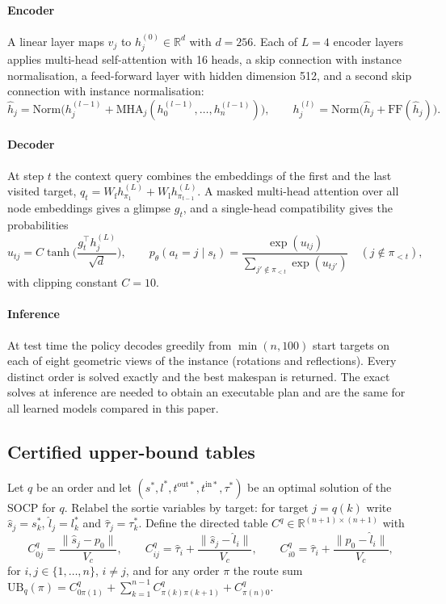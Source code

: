 \documentclass[preprint,review,12pt,authoryear]{elsarticle}
\newcommand{\R}{\mathbb{R}}
\newcommand{\UB}{\mathrm{UB}}
\begin{document}
\paragraph{Encoder} A linear layer maps $v_j$ to $h^{(0)}_j\in\R^{d}$ with $d=256$. Each of $L=4$ encoder layers
applies multi-head self-attention \citep{vaswani2017attention} with 16 heads, a skip connection with instance
normalisation, a feed-forward layer with hidden dimension 512, and a second skip connection with instance
normalisation:
\begin{equation}
\hat h_j=\mathrm{Norm}\big(h^{(l-1)}_j+\mathrm{MHA}_j(h^{(l-1)}_0,\dots,h^{(l-1)}_n)\big),\qquad
h^{(l)}_j=\mathrm{Norm}\big(\hat h_j+\mathrm{FF}(\hat h_j)\big).
\end{equation}

\paragraph{Decoder} At step $t$ the context query combines the embeddings of the first and the last visited
target, $q_t=W_{\mathrm{f}}h^{(L)}_{\pi_1}+W_{\mathrm{l}}h^{(L)}_{\pi_{t-1}}$. A masked multi-head attention over
all node embeddings gives a glimpse $g_t$, and a single-head compatibility gives the probabilities
\begin{equation}
u_{tj}=C\tanh\!\Big(\frac{g_t^{\top}h^{(L)}_j}{\sqrt d}\Big),\qquad
p_\theta(a_t=j\mid s_t)=\frac{\exp(u_{tj})}{\sum_{j'\notin\pi_{<t}}\exp(u_{tj'})}\quad(j\notin\pi_{<t}),
\end{equation}
with clipping constant $C=10$.

\paragraph{Inference} At test time the policy decodes greedily from $\min(n,100)$ start targets on each of
eight geometric views of the instance (rotations and reflections). Every distinct order is solved exactly and
the best makespan is returned. The exact solves at inference are needed to obtain an executable plan and are the
same for all learned models compared in this paper.

\subsection{Certified upper-bound tables}\label{sec:ubtable}
Let $q$ be an order and let $(s^*,l^*,t^{\mathrm{out}*},t^{\mathrm{in}*},\tau^*)$ be an optimal solution of the
SOCP for $q$. Relabel the sortie variables by target: for target $j=q(k)$ write $\hat s_j=s^*_k$,
$\hat l_j=l^*_k$ and $\hat\tau_j=\tau^*_k$. Define the directed table $C^q\in\R^{(n+1)\times(n+1)}$ with
\begin{equation}\label{eq:table}
C^q_{0j}=\frac{\|\hat s_j-p_0\|}{V_c},\qquad
C^q_{ij}=\hat\tau_i+\frac{\|\hat s_j-\hat l_i\|}{V_c},\qquad
C^q_{i0}=\hat\tau_i+\frac{\|p_0-\hat l_i\|}{V_c},
\end{equation}
for $i,j\in\{1,\dots,n\}$, $i\ne j$, and for any order $\pi$ the route sum
$\UB_q(\pi)=C^q_{0\pi(1)}+\sum_{k=1}^{n-1}C^q_{\pi(k)\pi(k+1)}+C^q_{\pi(n)0}$.
\end{document}

